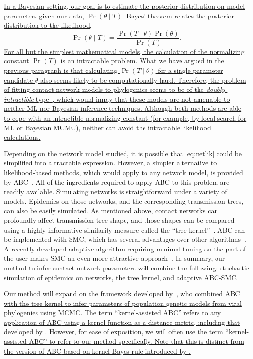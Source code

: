 {\color{blue}\uline{
In a Bayesian setting, our goal is to estimate the posterior distribution on
model parameters given our data, $\Pr(\theta \mid T)$. Bayes' theorem relates
the posterior distribution to the likelihood,}
\[
  \Pr(\theta \mid T) = \frac{\Pr(T \mid \theta) \Pr(\theta)}{\Pr(T)}.
\]
\uline{For all but the simplest mathematical models, the calculation of the
normalizing constant $\Pr(T)$ is an intractable problem. What we have argued in
the previous paragraph is that calculating $\Pr(T \mid \theta)$ for a single
parameter candidate $\theta$ also seems likely to be computationally hard.
Therefore, the problem of fitting contact network models to phylogenies seems
to be of the \emph{doubly-intractible} type~\autocite{murray2012mcmc}, which
would imply that these models are not amenable to neither \gls{ML} nor Bayesian
inference techniques. Although both methods are able to cope with an
intractible normalizing constant (for example, by local search for \gls{ML} or
Bayesian \gls{MCMC}), neither can avoid the intractable likelihood
calculations. }}

Depending on the network model studied, it is possible that \cref{eq:netlik}
could be simplified into a tractable expression. However, a simpler alternative
to likelihood-based methods, which would apply to any network model, is
provided by \gls{ABC}~\autocite{rubin1984bayesianly, tavare1997inferring,
fu1997estimating, beaumont2002approximate}. All of the ingredients required to
apply \gls{ABC} to this problem are readily available. Simulating networks is
straightforward under a variety of models. Epidemics on those networks, and the
corresponding transmission trees, can also be easily simulated. As mentioned
above, contact networks can profoundly affect transmission tree shape, and
those shapes can be compared using a highly informative similarity measure
called the ``tree kernel''~\autocite{poon2013mapping}. \Gls{ABC} can be
implemented with \gls{SMC}, which has several advantages over other
algorithms~\autocite{mckinley2009inference}. A recently-developed adaptive
algorithm requiring minimal tuning on the part of the user makes \gls{SMC} an
even more attractive approach~\autocite{del2012adaptive}. In summary, our
method to infer contact network parameters will combine the following:
stochastic simulation of epidemics on networks, the tree kernel, and adaptive
\gls{ABC}-\gls{SMC}. 

{\color{blue}\uline{
Our method will expand on the framework developed
by~\autocite{poon2015phylodynamic}, who combined \gls{ABC} with the tree kernel
to infer parameters of population genetic models from viral phylogenies using
\gls{MCMC}. The term ``kernel-assisted \gls{ABC}'' refers to any application of
\gls{ABC} using a kernel function as a distance metric, including that
developed by \citeauthor{poon2015phylodynamic}. However, for ease of
exposition, we will often use the term ``kernel-assisted \gls{ABC}'' to refer
to our method specifically. Note that this is distinct from the version of
\gls{ABC} based on kernel Bayes rule introduced by
\textcite{fukumizu2011kernel}.
}}

